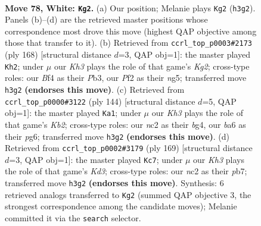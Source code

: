 \documentclass[11pt]{article}
\begin{document}
\clearpage

\begin{figure}[p]\centering
\begin{subfigure}{0.46\textwidth}\centering
\resizebox{\linewidth}{!}{%
\newchessgame
\chessboard[
  setfen={8/6k1/b7/8/5B2/7K/2n2P2/8 w - - 1 78},
  showmover=false,
  pgfstyle=straightmove, color=movearrow, markmove={h3-g2}
]}
\caption{}
\end{subfigure}\hfill
\begin{subfigure}{0.46\textwidth}\centering
\resizebox{\linewidth}{!}{%
\newchessgame
\chessboard[
  setfen={4B3/8/8/6n1/1b1k4/1P6/6K1/8 w - - 14 85},
  showmover=false,
  pgfstyle=straightmove, color=movearrow, markmove={g2-h2}
]}
\caption{}
\end{subfigure}
\\[4pt]
\begin{subfigure}{0.46\textwidth}\centering
\resizebox{\linewidth}{!}{%
\newchessgame
\chessboard[
  setfen={4k3/8/6p1/8/1B4b1/6P1/1K6/8 w - - 19 73},
  showmover=false,
  pgfstyle=straightmove, color=movearrow, markmove={b2-a1}
]}
\caption{}
\end{subfigure}\hfill
\begin{subfigure}{0.46\textwidth}\centering
\resizebox{\linewidth}{!}{%
\newchessgame
\chessboard[
  setfen={8/1P5p/3k3b/8/6K1/8/5B2/8 b - - 0 85},
  showmover=false,
  pgfstyle=straightmove, color=movearrow, markmove={d6-c7}
]}
\caption{}
\end{subfigure}
\caption{\textbf{Move 78, White: \texttt{Kg2}.} (a) Our position; Melanie plays \texttt{Kg2} (\texttt{h3g2}). Panels (b)--(d) are the retrieved master positions whose correspondence most drove this move (highest QAP objective among those that transfer to it). (b) Retrieved from \texttt{ccrl\_top\_p0003\#2173} (ply 168) [structural distance $d$=3, QAP obj=1]: the master played \texttt{Kh2}; under $\mu$ our \emph{Kh3} plays the role of that game's \emph{Kg2}; cross-type roles: our \emph{B}f4 as their \emph{P}b3, our \emph{P}f2 as their \emph{n}g5; transferred move \texttt{h3g2} \textbf{(endorses this move)}. (c) Retrieved from \texttt{ccrl\_top\_p0000\#3122} (ply 144) [structural distance $d$=5, QAP obj=1]: the master played \texttt{Ka1}; under $\mu$ our \emph{Kh3} plays the role of that game's \emph{Kb2}; cross-type roles: our \emph{n}c2 as their \emph{b}g4, our \emph{b}a6 as their \emph{p}g6; transferred move \texttt{h3g2} \textbf{(endorses this move)}. (d) Retrieved from \texttt{ccrl\_top\_p0002\#3179} (ply 169) [structural distance $d$=3, QAP obj=1]: the master played \texttt{Kc7}; under $\mu$ our \emph{Kh3} plays the role of that game's \emph{Kd3}; cross-type roles: our \emph{n}c2 as their \emph{p}b7; transferred move \texttt{h3g2} \textbf{(endorses this move)}. Synthesis: 6 retrieved analogs transferred to \texttt{Kg2} (summed QAP objective 3, the strongest correspondence among the candidate moves); Melanie committed it via the \texttt{search} selector.}
\label{fig:thought-m154}
\end{figure}
\end{document}
